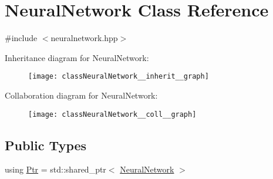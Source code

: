 \hypertarget{classNeuralNetwork}{}\section{Neural\+Network Class Reference}
\label{classNeuralNetwork}


{\ttfamily \#include $<$neuralnetwork.\+hpp$>$}



Inheritance diagram for Neural\+Network\+:\nopagebreak
\begin{figure}[H]
\begin{center}
\leavevmode
\texttt{[image: classNeuralNetwork\_\_inherit\_\_graph]}
\end{center}
\end{figure}


Collaboration diagram for Neural\+Network\+:\nopagebreak
\begin{figure}[H]
\begin{center}
\leavevmode
\texttt{[image: classNeuralNetwork\_\_coll\_\_graph]}
\end{center}
\end{figure}
\subsection*{Public Types}
\begin{DoxyCompactItemize}
\item 
using \hyperlink{classNeuralNetwork_a31de381df65f261fd0f38e0559995d1a}{Ptr} = std\+::shared\+\_\+ptr$<$ \hyperlink{classNeuralNetwork}{Neural\+Network} $>$
\end{DoxyCompactItemize}
